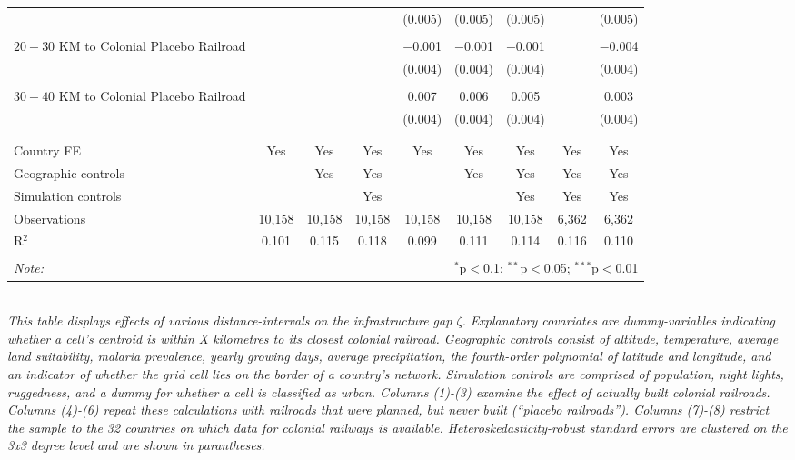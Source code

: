 \documentclass[11pt, oneside]{article}   	%
\begin{document}
\begin{table}[]
{\begin{tabular}{@{\extracolsep{5pt}}lcccccccc}
    &  &  &  & (0.005) & (0.005) & (0.005) &  & (0.005) \\
    & & & & & & & & \\
   $20-30$ KM to Colonial Placebo Railroad &  &  &  & $-$0.001 & $-$0.001 & $-$0.001 &  & $-$0.004 \\
    &  &  &  & (0.004) & (0.004) & (0.004) &  & (0.004) \\
    & & & & & & & & \\
   $30-40$ KM to Colonial Placebo Railroad &  &  &  & 0.007 & 0.006 & 0.005 &  & 0.003 \\
    &  &  &  & (0.004) & (0.004) & (0.004) &  & (0.004) \\
    & & & & & & & & \\
  \hline \\[-1.8ex]
  Country FE & Yes & Yes & Yes & Yes & Yes & Yes & Yes & Yes \\
  Geographic controls &  & Yes & Yes &  & Yes & Yes & Yes & Yes \\
  Simulation controls &  &  & Yes &  &  & Yes & Yes & Yes \\
  Observations & 10,158 & 10,158 & 10,158 & 10,158 & 10,158 & 10,158 & 6,362 & 6,362 \\
  R$^{2}$ & 0.101 & 0.115 & 0.118 & 0.099 & 0.111 & 0.114 & 0.116 & 0.110 \\
  \hline
  \hline \\[-1.8ex]
  \textit{Note:}  & \multicolumn{8}{r}{$^{*}$p$<$0.1; $^{**}$p$<$0.05; $^{***}$p$<$0.01} \\
  \end{tabular}

}

\justify
\textit{\\ \footnotesize This table displays effects of various distance-intervals on the infrastructure gap $\zeta$. Explanatory covariates are dummy-variables indicating whether a cell's centroid is within X kilometres to its closest colonial railroad. Geographic controls consist of altitude, temperature, average land suitability, malaria prevalence, yearly growing days, average precipitation, the fourth-order polynomial of latitude and longitude, and an indicator of whether the grid cell lies on the border of a country's network. Simulation controls are comprised of population, night lights, ruggedness, and a dummy for whether a cell is classified as urban. Columns (1)-(3) examine the effect of actually built colonial railroads. Columns (4)-(6) repeat these calculations with railroads that were planned, but never built (``placebo railroads''). Columns (7)-(8) restrict the sample to the 32 countries on which data for colonial railways is available. Heteroskedasticity-robust standard errors are clustered on the 3x3 degree level and are shown in parantheses.}
\end{table}
\end{document}
